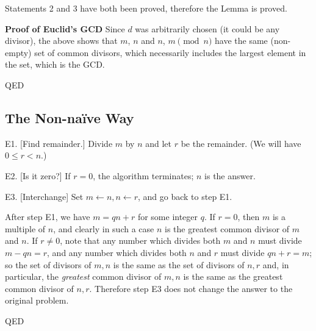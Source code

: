 \documentclass[12pt]{amsart}
\begin{document}
  Statements 2 and 3 have both been proved, therefore the Lemma is proved.

\textbf{Proof of Euclid's GCD}
  Since $d$ was arbitrarily chosen (it could be any divisor), the above
  shows that $m$, $n$ and $n$, $m\pmod n$ have the same (non-empty)
  set of common divisors, which necessarily includes the largest
  element in the set, which is the GCD.

  QED
  
  \subsection{The Non-na\"ive Way} 

  E1. [Find remainder.] Divide $m$ by $n$ and let $r$ be the remainder. (We will
  have $0 \le r < n$.)

  E2. [Is it zero?] If $r = 0$, the algorithm terminates; $n$ is the answer.

  E3. [Interchange] Set $m\leftarrow n, n \leftarrow r$, and go back to
  step E1.

  After step E1, we have $m = qn + r$ for some integer $q$. If $r = 0$, then
  $m$ is a multiple of $n$, and clearly in such a case $n$ is the greatest
  common divisor of $m$ and $n$. If $r \ne 0$, note that any number which
  divides both $m$ and $n$ must divide $m - qn = r$, and any number which
  divides both $n$ and $r$ must divide $qn + r = m$; so the set of divisors
  of $m, n$ is the same as the set of divisors of $n, r$ and, in particular, the
  \textit{greatest} common divisor of $m, n$ is the same as the greatest common divisor
  of $n, r$. Therefore step E3 does not change the answer to the original
  problem.

  QED
 
\end{document}
